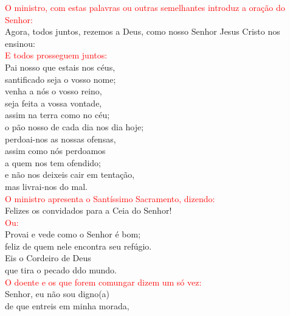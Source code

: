 \documentclass{book}
\begin{document}
\begin{flushleft}
    \textcolor{red}{O ministro, com estas palavras ou outras semelhantes introduz a oração do Senhor:}
    \vspace{.1cm} \\
    Agora, todos juntos, rezemos a Deus, como nosso Senhor Jesus Cristo nos ensinou:
    \vspace{.1cm} \\
    \textcolor{red}{E todos prosseguem juntos:}
    \vspace{.1cm} \\
    Pai nosso que estais nos céus, \\
    santificado seja o vosso nome; \\
    venha a nós o vosso reino, \\
    seja feita a vossa vontade, \\
    assim na terra como no céu; \\
    o pão nosso de cada dia nos dia hoje; \\
    perdoai-nos as nossas ofensas, \\
    assim como nós perdoamos \\
    a quem nos tem ofendido; \\
    e não nos deixeis cair em tentação, \\
    mas livrai-nos do mal.
    \vspace{.1cm} \\
    \textcolor{red}{O ministro apresenta o Santíssimo Sacramento, dizendo:}
    \vspace{.1cm} \\
    Felizes os convidados para a Ceia do Senhor!
    \vspace{.1cm} \\
    \textcolor{red}{Ou:}
    \vspace{.1cm} \\
    Provai e vede como o Senhor é bom; \\
    feliz de quem nele encontra seu refúgio. \\
    Eis o Cordeiro de Deus \\
    que tira o pecado ddo mundo.
    \vspace{.1cm} \\
    \textcolor{red}{O doente e os que forem comungar dizem um só vez:}
    \vspace{.1cm} \\
    Senhor, eu não sou digno(a) \\
    de que entreis em minha morada, \\

\end{flushleft}
\end{document}
